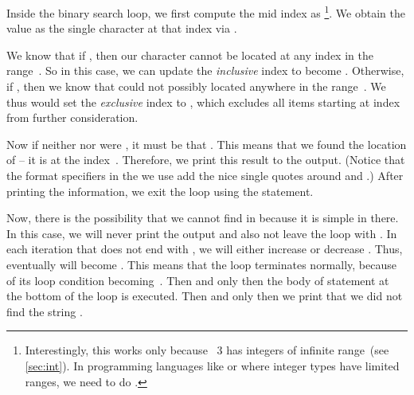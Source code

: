 Inside the binary search loop, we first compute the mid index as \footnote{%
Interestingly, this works only because \python~3 has integers of infinite range~(see \cref{sec:int}). %
In programming languages like  or  where integer types have limited ranges, we need to do .%
}.
We obtain the value  as the single character at that index via .

We know that if , then our character  cannot be located at any index in the range~.
So in this case, we can update the \emph{inclusive} index  to become .
Otherwise, if , then we know that  could not possibly located anywhere in the range~.
We thus would set the \emph{exclusive} index  to , which excludes all items starting at index  from further consideration.%
%
\begin{sloppypar}%
Now if neither  nor  were , it must be that .
This means that we found the location of  -- it is at the index~.
Therefore, we print this result to the output.
(Notice that the  format specifiers in the  we use add the nice single quotes around  and .)
After printing the information, we exit the  loop using the  statement.%
\end{sloppypar}%
%
Now, there is the possibility that we cannot find  in  because it is simple in there.
In this case, we will never print the output and also not leave the loop with .
In each iteration that does not end with , we will either increase  or decrease .
Thus, eventually  will become .
This means that the loop terminates normally, because of its loop condition becoming~.
Then and only then the body of  statement at the bottom of the loop is executed.
Then and only then we print that we did not find the string .

